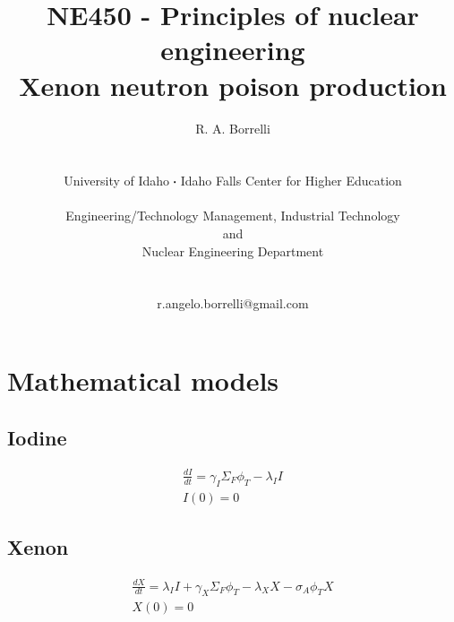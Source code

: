 \documentclass[11pt,a4paper]{article}
\newcommand*\sq{\mathbin{\vcenter{\hbox{\rule{.3ex}{.3ex}}}}} %
\begin{document}
\begin{titlepage}
    \title{
        NE450 - Principles of nuclear engineering\\
        Xenon neutron poison production\\
    }
    \author{
        R. A. Borrelli
        \\ \\ \\
        University of Idaho $\sq$ Idaho Falls Center for Higher Education
        \\ \\
        Engineering/Technology Management, Industrial Technology\\and\\Nuclear Engineering Department
        \\ \\ \\
        r.angelo.borrelli@gmail.com
    }
\clearpage %
\maketitle
\thispagestyle{empty} %
\end{titlepage}

\section{Mathematical models}
\subsection{Iodine}
\begin{equation}
\begin{gathered}
\frac{dI}{dt}=\gamma_I \Sigma_F \phi_T-\lambda_I I \\
I(0)=0
\end{gathered}
\end{equation}

\subsection{Xenon}
\begin{equation}
\begin{gathered}
\frac{dX}{dt}=\lambda_I I + \gamma_X \Sigma_F \phi_T - \lambda_X X - \sigma_A \phi_T X \\
X(0)=0
\end{gathered}
\end{equation}
\end{document}
